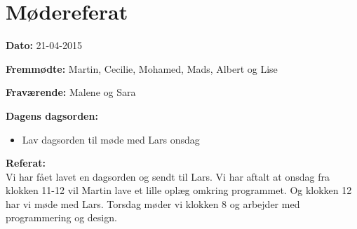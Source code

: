 \chapter{Mødereferat}

\textbf{Dato:} 21-04-2015

\textbf{Fremmødte:} Martin, Cecilie, Mohamed, Mads, Albert og Lise 

\textbf{Fraværende:} Malene og Sara

\textbf{Dagens dagsorden:}
\begin{itemize}
	\item Lav dagsorden til møde med Lars onsdag 
\end{itemize}

\textbf{Referat:}
\\
Vi har fået lavet en dagsorden og sendt til Lars. 
Vi har aftalt at onsdag fra klokken 11-12 vil Martin lave et lille oplæg omkring programmet. Og klokken 12 har vi møde med Lars. 
Torsdag møder vi klokken 8 og arbejder med programmering og design. 